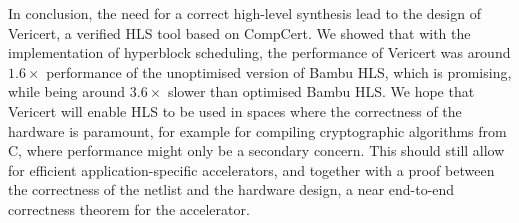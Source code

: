 In conclusion, the need for a correct high-level synthesis lead to the design of
Vericert, a verified \gls{HLS} tool based on CompCert.  We showed that with the
implementation of hyperblock scheduling, the performance of Vericert was around
$1.6\times$ performance of the unoptimised version of Bambu HLS, which is
promising, while being around $3.6\times$ slower than optimised Bambu HLS.  We
hope that Vericert will enable \gls{HLS} to be used in spaces where the
correctness of the hardware is paramount, for example for compiling
cryptographic algorithms from C, where performance might only be a secondary
concern.  This should still allow for efficient application-specific
accelerators, and together with a proof between the correctness of the netlist
and the hardware design, a near end-to-end correctness theorem for the
accelerator.


